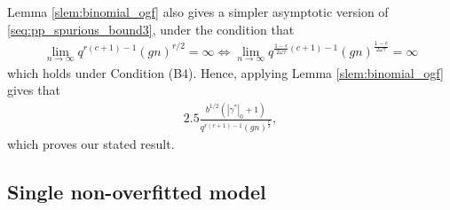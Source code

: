 Lemma \ref{slem:binomial_ogf} also gives a simpler asymptotic version of \eqref{seq:pp_spurious_bound3}, under the condition that
\begin{align}
\lim_{n \rightarrow \infty} q^{r(c + 1) -1} (g n)^{r/2} = \infty
\Leftrightarrow \lim_{n\rightarrow \infty} q^{\frac{1-\epsilon}{2 \omega \tau}(c + 1) -1} (g n)^{\frac{1-\epsilon}{2 \omega \tau}}= \infty
\nonumber
\end{align}
which holds under Condition (B4).
Hence, applying Lemma \ref{slem:binomial_ogf} gives that
\begin{align}
2.5
\frac{b^{1/2} (|\gamma^*|_0 +1)}{q^{r(c + 1) -1} (g n)^{\frac{r}{2}}},
\nonumber
\end{align}
which proves our stated result.



\subsection{Single non-overfitted model}


